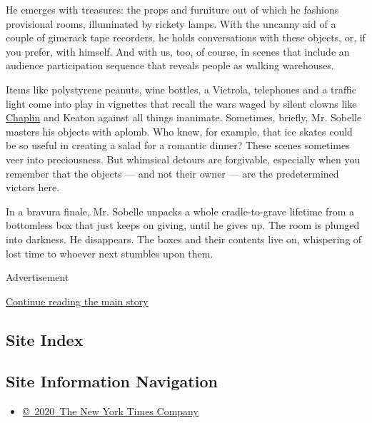 He emerges with treasures: the props and furniture out of which he
fashions provisional rooms, illuminated by rickety lamps. With the
uncanny aid of a couple of gimcrack tape recorders, he holds
conversations with these objects, or, if you prefer, with himself. And
with us, too, of course, in scenes that include an audience
participation sequence that reveals people as walking warehouses.

Items like polystyrene peanuts, wine bottles, a Victrola, telephones and
a traffic light come into play in vignettes that recall the wars waged
by silent clowns like
\href{https://www.youtube.com/watch?v=qNseEVlaCl4}{Chaplin} and Keaton
against all things inanimate. Sometimes, briefly, Mr. Sobelle masters
his objects with aplomb. Who knew, for example, that ice skates could be
so useful in creating a salad for a romantic dinner? These scenes
sometimes veer into preciousness. But whimsical detours are forgivable,
especially when you remember that the objects --- and not their owner
--- are the predetermined victors here.

In a bravura finale, Mr. Sobelle unpacks a whole cradle-to-grave
lifetime from a bottomless box that just keeps on giving, until he gives
up. The room is plunged into darkness. He disappears. The boxes and
their contents live on, whispering of lost time to whoever next stumbles
upon them.

Advertisement

\protect\hyperlink{after-bottom}{Continue reading the main story}

\hypertarget{site-index}{%
\subsection{Site Index}\label{site-index}}

\hypertarget{site-information-navigation}{%
\subsection{Site Information
Navigation}\label{site-information-navigation}}

\begin{itemize}
\tightlist
\item
  \href{https://help.nytimes3xbfgragh.onion/hc/en-us/articles/115014792127-Copyright-notice}{©~2020~The
  New York Times Company}
\end{itemize}


